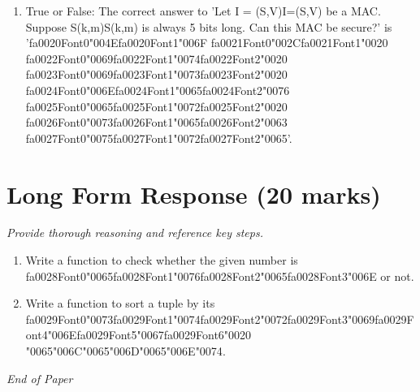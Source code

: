 \documentclass[12pt]{article}
\begin{document}
\begin{enumerate}[label=\arabic*.]
\item True or False: The correct answer to 'Let I = (S,V)I=(S,V) be a MAC. Suppose S(k,m)S(k,m) is always 5 bits long. Can this MAC be secure?' is '{\csname fa0020Font0\endcsname\char"004E}{\csname fa0020Font1\endcsname\char"006F} {\csname fa0021Font0\endcsname\char"002C}{\csname fa0021Font1\endcsname\char"0020} {\csname fa0022Font0\endcsname\char"0069}{\csname fa0022Font1\endcsname\char"0074}{\csname fa0022Font2\endcsname\char"0020} {\csname fa0023Font0\endcsname\char"0069}{\csname fa0023Font1\endcsname\char"0073}{\csname fa0023Font2\endcsname\char"0020} {\csname fa0024Font0\endcsname\char"006E}{\csname fa0024Font1\endcsname\char"0065}{\csname fa0024Font2\endcsname\char"0076} {\csname fa0025Font0\endcsname\char"0065}{\csname fa0025Font1\endcsname\char"0072}{\csname fa0025Font2\endcsname\char"0020} {\csname fa0026Font0\endcsname\char"0073}{\csname fa0026Font1\endcsname\char"0065}{\csname fa0026Font2\endcsname\char"0063} {\csname fa0027Font0\endcsname\char"0075}{\csname fa0027Font1\endcsname\char"0072}{\csname fa0027Font2\endcsname\char"0065}'.
\end{enumerate}

\section*{Long Form Response (20 marks)}
\textit{Provide thorough reasoning and reference key steps.}
\begin{enumerate}[label=\arabic*.]
\item Write a function to check whether the given number is {\csname fa0028Font0\endcsname\char"0065}{\csname fa0028Font1\endcsname\char"0076}{\csname fa0028Font2\endcsname\char"0065}{\csname fa0028Font3\endcsname\char"006E} or not.
\item Write a function to sort a tuple by its {\csname fa0029Font0\endcsname\char"0073}{\csname fa0029Font1\endcsname\char"0074}{\csname fa0029Font2\endcsname\char"0072}{\csname fa0029Font3\endcsname\char"0069}{\csname fa0029Font4\endcsname\char"006E}{\csname fa0029Font5\endcsname\char"0067}{\csname fa0029Font6\endcsname\char"0020} {\char"0065}{\char"006C}{\char"0065}{\char"006D}{\char"0065}{\char"006E}{\char"0074}.
\end{enumerate}

\vfill
\noindent\textit{End of Paper}
\end{document}
